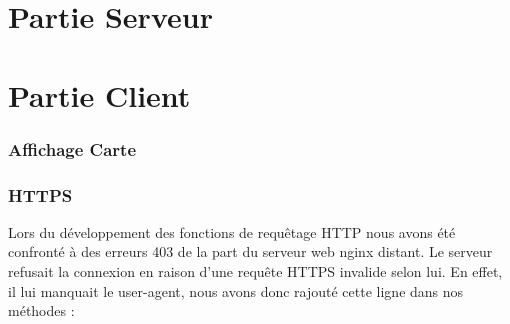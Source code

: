 \section{Partie Serveur}
\section{Partie Client}
	\subsubsection{Affichage Carte}
	\subsubsection{HTTPS}
		Lors du développement des fonctions de requêtage HTTP nous avons été confronté à des erreurs 403 de la part du serveur web nginx distant. Le serveur refusait la connexion 
		en raison d'une requête HTTPS invalide selon lui. En effet, il lui manquait le user-agent, nous avons donc rajouté cette ligne dans nos méthodes :
			\begin{listing}[H]
				\inputminted[fontsize=\scriptsize]{java}{code/user-agent.java}
			\end{listing}
